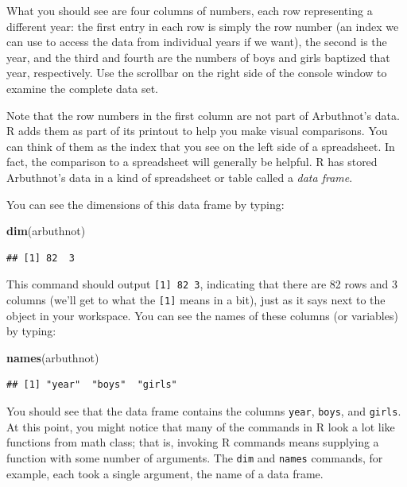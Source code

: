 \documentclass[
]{article}
\newenvironment{Shaded}{\begin{snugshade}}{\end{snugshade}}
\newcommand{\KeywordTok}[1]{\textcolor[rgb]{0.13,0.29,0.53}{\textbf{#1}}}
\newcommand{\NormalTok}[1]{#1}
\begin{document}
What you should see are four columns of numbers, each row representing a
different year: the first entry in each row is simply the row number (an
index we can use to access the data from individual years if we want),
the second is the year, and the third and fourth are the numbers of boys
and girls baptized that year, respectively. Use the scrollbar on the
right side of the console window to examine the complete data set.

Note that the row numbers in the first column are not part of
Arbuthnot's data. R adds them as part of its printout to help you make
visual comparisons. You can think of them as the index that you see on
the left side of a spreadsheet. In fact, the comparison to a spreadsheet
will generally be helpful. R has stored Arbuthnot's data in a kind of
spreadsheet or table called a \emph{data frame}.

You can see the dimensions of this data frame by typing:

\begin{Shaded}
\begin{Highlighting}[]
\KeywordTok{dim}\NormalTok{(arbuthnot)}
\end{Highlighting}
\end{Shaded}

\begin{verbatim}
## [1] 82  3
\end{verbatim}

This command should output \texttt{{[}1{]}\ 82\ 3}, indicating that
there are 82 rows and 3 columns (we'll get to what the \texttt{{[}1{]}}
means in a bit), just as it says next to the object in your workspace.
You can see the names of these columns (or variables) by typing:

\begin{Shaded}
\begin{Highlighting}[]
\KeywordTok{names}\NormalTok{(arbuthnot)}
\end{Highlighting}
\end{Shaded}

\begin{verbatim}
## [1] "year"  "boys"  "girls"
\end{verbatim}

You should see that the data frame contains the columns \texttt{year},
\texttt{boys}, and \texttt{girls}. At this point, you might notice that
many of the commands in R look a lot like functions from math class;
that is, invoking R commands means supplying a function with some number
of arguments. The \texttt{dim} and \texttt{names} commands, for example,
each took a single argument, the name of a data frame.
\end{document}
